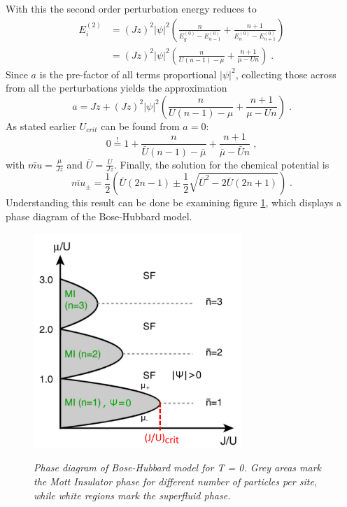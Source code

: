 With this the second order perturbation energy reduces to
\begin{align}
	E_{i}^{(2)} &= \left( J z \right)^2 |\psi|^2 \left( \frac{n}{E_{g}^{(0)}- E_{n-1}^{(0)}} +  \frac{n+1}{E_{n}^{(0)}- E_{n+1}^{(0)}} \right) \nonumber \\
	&= \left( J z \right)^2 |\psi|^2 \left( \frac{n}{U(n-1) - \mu} + \frac{n+1}{\mu - U n} \right) \; .
\end{align}
Since $a$ is the pre-factor of all terms proportional $|\psi|^2$, collecting those across from all the perturbations yields the approximation 
\begin{equation}
	a = J z + \left( J z \right)^2 |\psi|^2 \left( \frac{n}{U(n-1) - \mu} + \frac{n+1}{\mu - U n} \right) \; .
\end{equation} 
As stated earlier $U_{crit}$ can be found from $a = 0$:
\begin{equation}
	0 \overset{!}{=} 1 + \frac{n}{\bar{U} (n-1) - \bar{\mu}} + \frac{n+1}{\bar{\mu} - \bar{U} n} \; ,
\end{equation}
with $\bar{mu} = \frac{\mu}{J z}$ and $\bar{U} = \frac{U}{J z}$. Finally, the solution for the chemical potential is \cite{vanoosten}
\begin{equation}
	\bar{mu}_{\pm} = \frac{1}{2} \left( \bar{U}(2n -1) \pm \frac{1}{2} \sqrt{\bar{U}^2 - 2 \bar{U} (2 n +1)} \right) \; .
\end{equation}
Understanding this result can be done be examining figure \ref{fig:SFMOTT}, which displays a phase diagram of the Bose-Hubbard model.  
\begin{figure}[h]
	\centering
	\includegraphics[width = 0.7\textwidth]{Figures/SFMottPhase.pdf}
	\label{fig:SFMOTT}
	\caption{\textit{Phase diagram of Bose-Hubbard model for T = 0. Grey areas mark the Mott Insulator phase for different number of particles per site, while white regions mark the superfluid phase. \cite{greiner}}}
\end{figure}
